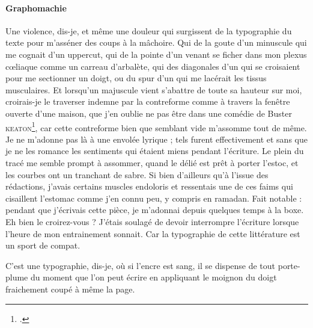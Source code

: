 \paragraph{Graphomachie}
Une violence, dis-je, et même une douleur qui surgissent de la typographie du texte pour m’asséner des coups à la mâchoire. Qui de la goute d’un  minuscule qui me cognait d’un uppercut, qui de la pointe d’un  venant se ficher dans mon plexus cœliaque comme un carreau d’arbalète, qui des diagonales d’un  qui se croisaient pour me sectionner un doigt, ou du spur d’un  qui me lacérait les tissus musculaires. Et lorsqu’un  majuscule vient s’abattre de toute sa hauteur sur moi, croirais-je le traverser indemne par la contreforme comme à travers la fenêtre ouverte d’une maison, que j’en oublie ne pas être dans une comédie de Buster \textsc{keaton}\footcite{keaton1928SteamboatBill}, car cette contreforme bien que semblant vide m’assomme tout de même. Je ne m’adonne pas là à une envolée lyrique ; tels furent effectivement et sans que je ne les romance les sentiments qui étaient miens pendant l’écriture. Le plein du tracé me semble prompt à assommer, quand le délié est prêt à porter l’estoc, et les courbes ont un tranchant de sabre.  Si bien d’ailleurs qu’à l’issue des rédactions, j’avais certains muscles endoloris et ressentais une de ces faims qui cisaillent l’estomac comme j’en connu peu, y compris en ramadan. Fait notable : pendant que j’écrivais cette pièce, je m’adonnai depuis quelques temps à la boxe. Eh bien le croirez-vous ? J’étais soulagé de devoir interrompre l’écriture lorsque l’heure de mon entrainement sonnait. Car la typographie de cette littérature est un sport de compat.

C’est une typographie, dis-je, où si l’encre est sang, il se dispense de tout porte-plume du moment que l’on peut écrire en appliquant le moignon du doigt fraichement coupé  à même la page.


\newcommand\doubledate[2]{\footnotesize#1\\\tiny #2}

